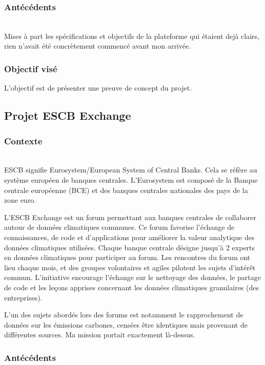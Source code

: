 \subsubsection{Antécédents}
~\\
Mises à part les spécifications et objectifs de la plateforme qui étaient dejà clairs, rien n'avait été concrètement commencé avant mon arrivée.
\subsubsection{Objectif visé}

L'objectif est de présenter une preuve de concept du projet.

\pagebreak
\subsection{Projet ESCB Exchange}

\subsubsection{Contexte}
~\\
ESCB signifie Eurosystem/European System of Central Banks. Cela se réfère au système européen de banques centrales. 
L'Eurosystem est composé de la Banque centrale européenne (BCE) et des banques centrales nationales des pays de la zone euro. 

L'ESCB Exchange est un forum permettant aux banques centrales de collaborer autour de données climatiques communes. 
Ce forum favorise l'échange de connaissances, de code et d'applications pour améliorer la valeur analytique des données climatiques utilisées. 
Chaque banque centrale désigne jusqu'à 2 experts en données climatiques pour participer au forum. 
Les rencontres du forum ont lieu chaque mois, et des groupes volontaires et agiles pilotent les sujets d'intérêt commun. 
L'initiative encourage l'échange sur le nettoyage des données, le partage de code et les leçons apprises concernant les données climatiques granulaires (des entreprises).

L'un des sujets abordés lors des forums est notamment le rapprochement de données sur les émissions carbones, censées être identiques mais provenant de différentes sources.
Ma mission portait exactement là-dessus.

\subsubsection{Antécédents}
~\\
